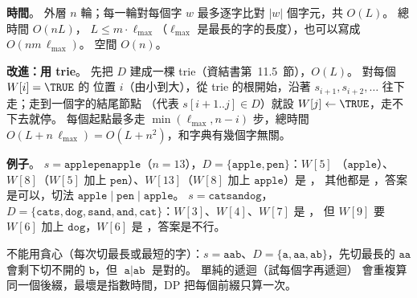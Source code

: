 \begin{pastsoln}
\textbf{時間}。 外層 $n$ 輪；每一輪對每個字 $w$ 最多逐字比對 $|w|$ 個字元，共 $O(L)$。 總時間 $O(nL)$，
$L \le m \cdot \ell_{\max}$（$\ell_{\max}$ 是最長的字的長度），也可以寫成 $O(nm\,\ell_{\max})$。 空間 $O(n)$。

\textbf{改進：用 trie}。 先把 $D$ 建成一棵 trie（資結書第~11.5~節），$O(L)$。 對每個 $W[i] = \TRUE$ 的
位置 $i$（由小到大），從 trie 的根開始，沿著 $s_{i+1}, s_{i+2}, \ldots$ 往下走；走到一個字的結尾節點
（代表 $s[i+1..j] \in D$）就設 $W[j] \gets \TRUE$，走不下去就停。 每個起點最多走 $\min(\ell_{\max}, n - i)$
步，總時間 $O(L + n\,\ell_{\max}) = O(L + n^2)$，和字典有幾個字無關。

\textbf{例子}。 $s = \texttt{applepenapple}$（$n = 13$），$D = \{\texttt{apple}, \texttt{pen}\}$：$W[5]$
（$\texttt{apple}$）、$W[8]$（$W[5]$ 加上 $\texttt{pen}$）、$W[13]$（$W[8]$ 加上 $\texttt{apple}$）是 \TRUE，
其他都是 \FALSE，答案是可以，切法 $\texttt{apple}\mid\texttt{pen}\mid\texttt{apple}$。 $s = \texttt{catsandog}$，
$D = \{\texttt{cats}, \texttt{dog}, \texttt{sand}, \texttt{and}, \texttt{cat}\}$：$W[3]$、$W[4]$、$W[7]$ 是 \TRUE，
但 $W[9]$ 要 $W[6]$ 加上 $\texttt{dog}$，$W[6]$ 是 \FALSE，答案是不行。

不能用貪心（每次切最長或最短的字）：$s = \texttt{aab}$、$D = \{\texttt{a}, \texttt{aa}, \texttt{ab}\}$，先切最長的
$\texttt{aa}$ 會剩下切不開的 $\texttt{b}$，但 $\texttt{a}\mid\texttt{ab}$ 是對的。 單純的遞迴（試每個字再遞迴）
會重複算同一個後綴，最壞是指數時間，DP 把每個前綴只算一次。
\end{pastsoln}
